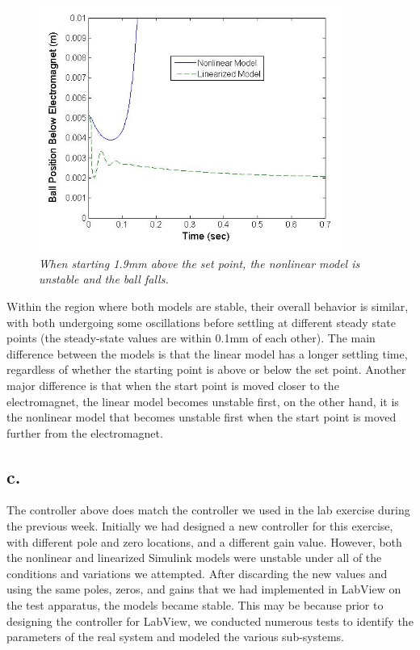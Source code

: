 \documentclass{article}
\theoremstyle{plain}
\theoremstyle{definition}
\theoremstyle{remark}
\begin{document}
\begin{figure}[h!]
\begin{center}
\includegraphics[width = 10cm]{Part2bFarDisturbance}
\caption{\emph{When starting 1.9mm above the set point, the nonlinear model is unstable and the ball falls.}}
\label{Q2_b6}
\end{center}
\end{figure}

Within the region where both models are stable, their overall behavior is similar, with both undergoing some oscillations before settling at different steady state points (the steady-state values are within 0.1mm of each other). The main difference between the models is that the linear model has a longer settling time, regardless of whether the starting point is above or below the set point. Another major difference is that when the start point is moved closer to the electromagnet, the linear model becomes unstable first, on the other hand, it is the nonlinear model that becomes unstable first when the start point is moved further from the electromagnet. 

\subsection*{c.}
The controller above does match the controller we used in the lab exercise during the previous week. Initially we had designed a new controller for this exercise, with different pole and zero locations, and a different gain value. However, both the nonlinear and linearized Simulink models were unstable under all of the conditions and variations we attempted. After discarding the new values and using the same poles, zeros, and gains that we had implemented in LabView on the test apparatus, the models became stable. This may be because prior to designing the controller for LabView, we conducted numerous tests to identify the parameters of the real system and modeled the various sub-systems. 
\end{document}
